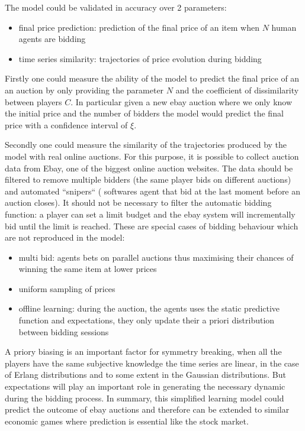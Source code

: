 The model could be validated in accuracy over 2 parameters:
\begin{itemize}
\item final price prediction: prediction of the final price of an item when $N$
      human agents are bidding
\item time series similarity: trajectories of price evolution during bidding
\end{itemize}
Firstly one could measure the ability of the model to predict the final price
of an an auction by only providing the parameter $N$ and the coefficient
of dissimilarity between players $C$.
In particular given a new ebay auction where we only know the initial price and
 the number of bidders the model would predict the final price with a confidence
 interval of $\xi$.

Secondly one could measure the similarity of the trajectories produced by the
 model with real online auctions.
For this purpose, it is possible to collect auction data from Ebay,
one of the biggest online auction websites.
The data should be filtered to remove multiple bidders (the same player bids on
different auctions) and automated ``snipers`` ( softwares agent that bid at the
last moment before an auction closes).
It should not be necessary to filter the automatic bidding function:
a player can set a limit budget and the ebay system will incrementally bid until
 the limit is reached.
These are special cases of bidding behaviour which are not reproduced in the model:
\begin{itemize}
 \item multi bid: agents bets on parallel auctions thus maximising their
chances of winning the same item at lower prices
 \item uniform sampling of prices
 \item offline learning: during the auction, the agents uses the static predictive function
 and expectations, they only update their a priori distribution between bidding
 sessions
\end{itemize}

A priory biasing is an important factor for symmetry breaking, when all the players
 have the same subjective knowledge the time series are linear, in the case of Erlang
 distributions and to some extent in the Gaussian distributions.
But expectations will play an important role in generating the necessary
dynamic during the bidding process.
In summary, this simplified learning model could predict the outcome of ebay
auctions and therefore can be extended to similar economic games where prediction
is essential like the stock market. 